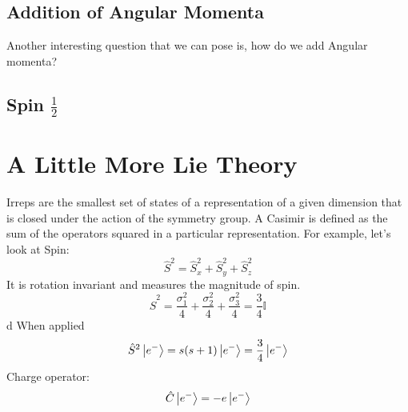 \documentclass[]{article}
\begin{document}
\subsection{Addition of Angular Momenta}
Another interesting question that we can pose is, how do we add Angular momenta? 
\subsection{Spin $\frac{1}{2}$}

\section{A Little More Lie Theory}
Irreps are the smallest set of states of a representation of a given dimension that is closed under the action of the symmetry group. A Casimir is defined as the sum of the operators squared in a particular representation. For example, let's look at Spin:
\begin{equation}
\hat{S}^{2} = \hat{S}_{x}^{2} + \hat{S}_{y}^{2} + \hat{S}_{z}^{2}
\end{equation}
It is rotation invariant and measures the magnitude of spin.
\begin{equation}
\hat{S}^{2} = \frac{\sigma^{2}_{1}}{4} + \frac{\sigma^{2}_{2}}{4} + \frac{\sigma^{2}_{3}}{4} = \frac{3}{4} \mathbb{I}
\end{equation}d
When applied 
\begin{equation}
\hat{S}^{2} \ket{e^{-}} = s(s+1) \ket{e^{-}} = \frac{3}{4} \ket{e^{-}}
\end{equation}
Charge operator:
\begin{equation}
\hat{C} \ket{e^{-}} = - e \ket{e^{-}}
\end{equation}
\end{document}
